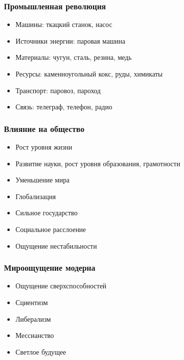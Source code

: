 \documentclass[aspectratio=169]{beamer}
\begin{document}
\begin{bframe}\frametitle{Промышленная революция}
\begin{itemize}
\item<1-> Машины: ткацкий станок, насос
\item<3-> Источники энергии: паровая машина
\item<5-> Материалы: чугун, сталь, резина, медь
\item<6-> Ресурсы: каменноугольный кокс, руды, химикаты
\item<7-> Транспорт: паровоз, пароход
\item<9-> Связь: телеграф, телефон, радио
\end{itemize}
\end{bframe}

\begin{bframe}\frametitle{Влияние на общество}
\begin{itemize}
\item<+-> Рост уровня жизни
\item<+-> Развитие науки, рост уровня образования, грамотности
\item<+-> Уменьшение мира
\item<+-> Глобализация
\item<+-> Сильное государство
\item<+-> Социальное расслоение
\item<+-> Ощущение нестабильности
\end{itemize}
\end{bframe}

\begin{bframe}\frametitle{Мироощущение модерна}
\begin{itemize}
\item<+-> Ощущение сверхспособностей
\item<+-> Сциентизм
\item<+-> Либерализм
\item<+-> Мессианство
\item<+-> Светлое будущее
\end{itemize}
\end{bframe}
\end{document}
